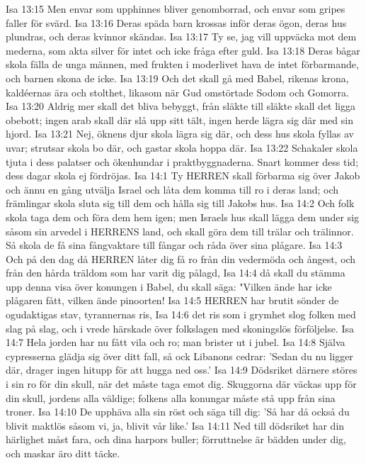Isa 13:15  Men envar som upphinnes bliver genomborrad, och envar som gripes faller för svärd.
Isa 13:16  Deras späda barn krossas inför deras ögon, deras hus plundras, och deras kvinnor skändas.
Isa 13:17  Ty se, jag vill uppväcka mot dem mederna, som akta silver för intet och icke fråga efter guld.
Isa 13:18  Deras bågar skola fälla de unga männen, med frukten i moderlivet hava de intet förbarmande, och barnen skona de icke.
Isa 13:19  Och det skall gå med Babel, rikenas krona, kaldéernas ära och stolthet, likasom när Gud omstörtade Sodom och Gomorra.
Isa 13:20  Aldrig mer skall det bliva bebyggt, från släkte till släkte skall det ligga obebott; ingen arab skall där slå upp sitt tält, ingen herde lägra sig där med sin hjord.
Isa 13:21  Nej, öknens djur skola lägra sig där, och dess hus skola fyllas av uvar; strutsar skola bo där, och gastar skola hoppa där.
Isa 13:22  Schakaler skola tjuta i dess palatser och ökenhundar i praktbyggnaderna. Snart kommer dess tid; dess dagar skola ej fördröjas.
Isa 14:1  Ty HERREN skall förbarma sig över Jakob och ännu en gång utvälja Israel och låta dem komma till ro i deras land; och främlingar skola sluta sig till dem och hålla sig till Jakobs hus.
Isa 14:2  Och folk skola taga dem och föra dem hem igen; men Israels hus skall lägga dem under sig såsom sin arvedel i HERRENS land, och skall göra dem till trälar och trälinnor. Så skola de få sina fångvaktare till fångar och råda över sina plågare.
Isa 14:3  Och på den dag då HERREN låter dig få ro från din vedermöda och ångest, och från den hårda träldom som har varit dig pålagd,
Isa 14:4  då skall du stämma upp denna visa över konungen i Babel, du skall säga: "Vilken ände har icke plågaren fått, vilken ände pinoorten!
Isa 14:5  HERREN har brutit sönder de ogudaktigas stav, tyrannernas ris,
Isa 14:6  det ris som i grymhet slog folken med slag på slag, och i vrede härskade över folkslagen med skoningslös förföljelse.
Isa 14:7  Hela jorden har nu fått vila och ro; man brister ut i jubel.
Isa 14:8  Själva cypresserna glädja sig över ditt fall, så ock Libanons cedrar: 'Sedan du nu ligger där, drager ingen hitupp för att hugga ned oss.'
Isa 14:9  Dödsriket därnere störes i sin ro för din skull, när det måste taga emot dig. Skuggorna där väckas upp för din skull, jordens alla väldige; folkens alla konungar måste stå upp från sina troner.
Isa 14:10  De upphäva alla sin röst och säga till dig: 'Så har då också du blivit maktlös såsom vi, ja, blivit vår like.'
Isa 14:11  Ned till dödsriket har din härlighet måst fara, och dina harpors buller; förruttnelse är bädden under dig, och maskar äro ditt täcke.
